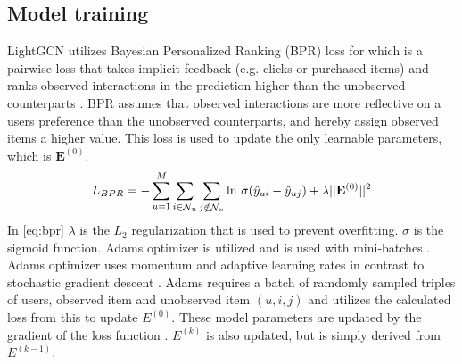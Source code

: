 \subsection{Model training}
LightGCN utilizes Bayesian Personalized Ranking (BPR) loss for which is a pairwise loss that takes implicit feedback (e.g. clicks or purchased items) and ranks observed interactions in the prediction higher than the unobserved counterparts \cite{lightgcn,BPR}.
BPR assumes that observed interactions are more reflective on a users preference than the unobserved counterparts, and hereby assign observed items a higher value.
This loss is used to update the only learnable parameters, which is $\mathbf{E}^{(0)}$.
\begin{equation}
    L_{BPR} = - \sum^M_{u=1} \sum_{i \in \mathcal{N}_u} \sum_{j \notin \mathcal{N}_u} \textnormal{ln } \sigma (\hat{y}_{ui} - \hat{y}_{uj}) + \lambda||\mathbf{E}^{(0)}||^2 
    \label{eq:bpr}
\end{equation}
In \autoref{eq:bpr} $\lambda$ is the $L_2$ regularization that is used to prevent overfitting. 
$\sigma$ is the sigmoid function.
Adams optimizer is utilized and is used with mini-batches \cite{lightgcn,Adams-optimizer}.
Adams optimizer uses momentum and adaptive learning rates in contrast to stochastic gradient descent \cite{Adams-optimizer}.
Adams requires a batch of ramdomly sampled triples of users, observed item and unobserved item $(u, i, j)$ and utilizes the calculated loss from this to update $E^{(0)}$.
These model parameters are updated by the gradient of the loss function \cite{NGCF_2019,Adams-optimizer}.
$E^{(k)}$ is also updated, but is simply derived from $E^{(k-1)}$.